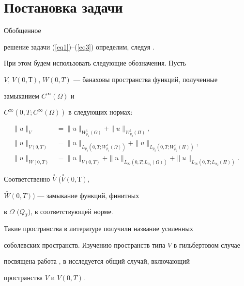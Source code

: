 \section{Постановка задачи}





Обобщенное 


решение задачи (\ref{eq1})--(\ref{eq3}) определим, следуя \cite{2}.


При этом будем использовать следующие обозначения. Пусть


$V$, $V(0,Т)$, $W(0,T)$ --- банаховы пространства функций, полученные


замыканием $C^{\infty}(\Omega)$ и


$C^{\infty}(0,T; C^{\infty}(\Omega))$ в следующих нормах:


\begin{align*}


\| u \|_{V}&=\| u \|_{W^{1}_{p_{1}} (\Omega)}+


\| u \|_{W^{1}_{p_{2}}(\Pi)}, \\


%


\| u \|_{V(0,T)}&=


\| u \|_{L_{p_{1}}(0,T;W^{1}_{p_{1}} (\Omega))}+


\| u \|_{L_{p_{2}}(0,T;W^{1}_{p_{2}}(\Pi))}, \\


%


\| u \|_{W(0,T)}&=\| u \|_{V(0,T)}+


\| u \|_{L_{\infty}(0,T;L_{\alpha_{1}}(\Omega))}+


\| u \|_{L_{\infty}(0,T;L_{\alpha_{2}}(\Pi))}.


\end{align*}


Соответственно $ \overset{\circ}{V}$ ($\overset{\circ}{V}(0,Т)$,


$\overset{\circ}{W}(0,T)$) --- замыкание функций, финитных


в $\Omega$ $(Q_{T}$), в соответствующей норме. 


Такие пространства в литературе получили название усиленных


соболевских пространств. Изучению пространств типа $V$ в гильбертовом случае


посвящена работа \cite{4}, в \cite{5} исследуется общий случай, включающий


пространства $V$ и $V(0,T)$.





